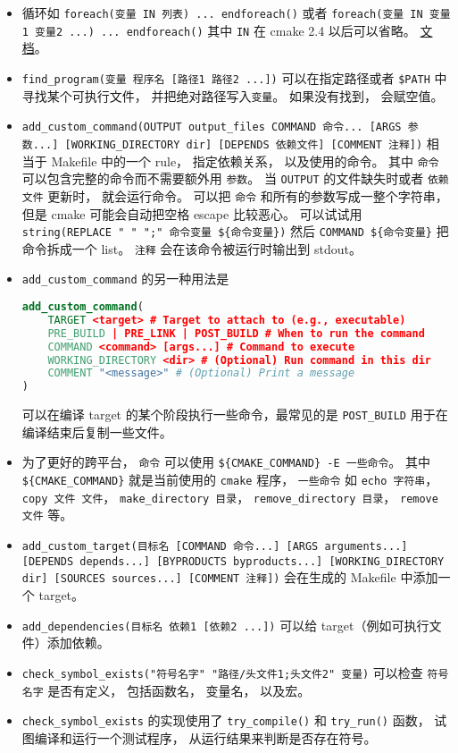 \begin{itemize}
\item 循环如 \verb`foreach(变量 IN 列表) ... endforeach()` 或者 \verb`foreach(变量 IN 变量1 变量2 ...) ... endforeach()` 其中 \verb`IN` 在 cmake 2.4 以后可以省略。 \href{https://cmake.org/cmake/help/latest/command/foreach.html}{文档}。
\item \verb`find_program(变量 程序名 [路径1 路径2 ...])` 可以在指定路径或者 \verb`$PATH` 中寻找某个可执行文件， 并把绝对路径写入\verb`变量`。 如果没有找到， 会赋空值。
\item \verb`add_custom_command(OUTPUT output_files COMMAND 命令... [ARGS 参数...] [WORKING_DIRECTORY dir] [DEPENDS 依赖文件] [COMMENT 注释])` 相当于 Makefile 中的一个 rule， 指定依赖关系， 以及使用的命令。 其中 \verb`命令` 可以包含完整的命令而不需要额外用 \verb`参数`。 当 \verb`OUTPUT` 的文件缺失时或者 \verb`依赖文件` 更新时， 就会运行命令。 可以把 \verb`命令` 和所有的参数写成一整个字符串， 但是 cmake 可能会自动把空格 escape 比较恶心。 可以试试用 \verb`string(REPLACE " " ";" 命令变量 ${命令变量})` 然后 \verb`COMMAND ${命令变量}` 把命令拆成一个 list。 \verb`注释` 会在该命令被运行时输出到 stdout。
\item \verb`add_custom_command` 的另一种用法是
\begin{lstlisting}[language=cmake]
add_custom_command(
    TARGET <target> # Target to attach to (e.g., executable)
    PRE_BUILD | PRE_LINK | POST_BUILD # When to run the command
    COMMAND <command> [args...] # Command to execute
    WORKING_DIRECTORY <dir> # (Optional) Run command in this dir
    COMMENT "<message>" # (Optional) Print a message
)
\end{lstlisting}
可以在编译 target 的某个阶段执行一些命令，最常见的是 \verb`POST_BUILD` 用于在编译结束后复制一些文件。
\item 为了更好的跨平台， \verb`命令` 可以使用 \verb`${CMAKE_COMMAND} -E 一些命令`。 其中 \verb`${CMAKE_COMMAND}` 就是当前使用的 \verb`cmake` 程序， \verb`一些命令` 如 \verb`echo 字符串`，\verb`copy 文件 文件`， \verb`make_directory 目录`， \verb`remove_directory 目录`， \verb`remove 文件` 等。
\item \verb`add_custom_target(目标名 [COMMAND 命令...] [ARGS arguments...] [DEPENDS depends...] [BYPRODUCTS byproducts...] [WORKING_DIRECTORY dir] [SOURCES sources...] [COMMENT 注释])` 会在生成的 Makefile 中添加一个 target。
\item \verb`add_dependencies(目标名 依赖1 [依赖2 ...])` 可以给 target（例如可执行文件）添加依赖。
\item \verb`check_symbol_exists("符号名字" "路径/头文件1;头文件2" 变量)` 可以检查 \verb`符号名字` 是否有定义， 包括函数名， 变量名， 以及宏。
\item \verb`check_symbol_exists` 的实现使用了 \verb`try_compile()` 和 \verb`try_run()` 函数， 试图编译和运行一个测试程序， 从运行结果来判断是否存在符号。
\end{itemize}

